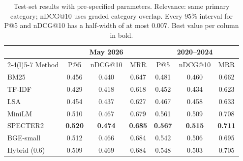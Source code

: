 \begin{table}[!t]
\centering
\caption{Test-set results with pre-specified parameters. Relevance: same primary category; nDCG@10 uses graded category overlap. Every 95\% interval for P@5 and nDCG@10 has a half-width of at most 0.007. Best value per column in bold.}
\label{tab:main}
\footnotesize
\setlength{\tabcolsep}{3.2pt}
\begin{tabular}{@{}lcccccc@{}}
\toprule
 & \multicolumn{3}{c}{May 2026} & \multicolumn{3}{c}{2020--2024} \\
\cmidrule(lr){2-4}\cmidrule(l){5-7}
Method & P@5 & nDCG@10 & MRR & P@5 & nDCG@10 & MRR \\
\midrule
BM25 & 0.456 & 0.440 & 0.647 & 0.481 & 0.460 & 0.662 \\
TF-IDF & 0.429 & 0.418 & 0.618 & 0.452 & 0.434 & 0.623 \\
LSA & 0.454 & 0.437 & 0.627 & 0.467 & 0.458 & 0.633 \\
\midrule
MiniLM & 0.510 & 0.467 & 0.679 & 0.561 & 0.509 & 0.708 \\
SPECTER2 & \textbf{0.520} & \textbf{0.474} & \textbf{0.685} & \textbf{0.567} & \textbf{0.515} & \textbf{0.711} \\
BGE-small & 0.512 & 0.466 & 0.684 & 0.542 & 0.506 & 0.695 \\
\midrule
Hybrid (0.6) & 0.509 & 0.469 & 0.684 & 0.548 & 0.503 & 0.705 \\
\bottomrule
\end{tabular}
\end{table}
